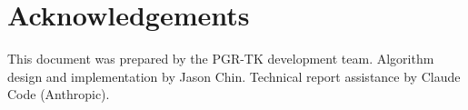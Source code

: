 \documentclass[11pt,a4paper]{article}
\begin{document}
\section*{Acknowledgements}

This document was prepared by the PGR-TK development team.
Algorithm design and implementation by Jason Chin.
Technical report assistance by Claude Code (Anthropic).

\end{document}
